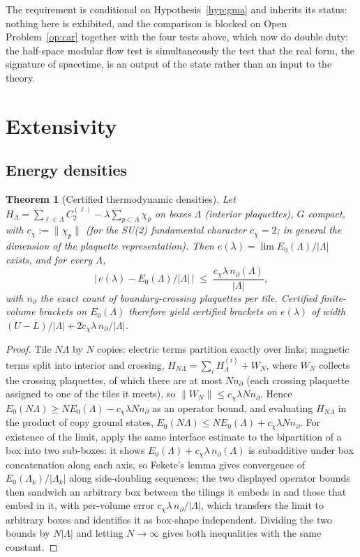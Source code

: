 \documentclass[11pt]{article}
\newtheorem{theorem}{Theorem}[section]
\theoremstyle{definition}
\theoremstyle{remark}
\begin{document}
The requirement is conditional on Hypothesis~\ref{hyp:gma} and inherits
its status: nothing here is exhibited, and the comparison is blocked on
Open Problem~\ref{op:car} together with the four tests above, which now
do double duty: the half-space modular flow test is simultaneously the
test that the real form, the signature of spacetime, is an output of
the state rather than an input to the theory.

\section{Extensivity}\label{sec:extensivity}

\subsection{Energy densities}
\begin{theorem}[Certified thermodynamic densities]\label{thm:density}
Let $H_\Lambda = \sum_{\ell \in \Lambda} C_2^{(\ell)} - \lambda
\sum_{p \subset \Lambda} \chi_p$ on boxes $\Lambda$ (interior
plaquettes), $G$ compact, with $c_\chi := \|\chi_p\|$ (for the SU(2)
fundamental character $c_\chi = 2$; in general the dimension of the
plaquette representation).  Then $e(\lambda) = \lim
E_0(\Lambda)/|\Lambda|$ exists, and for every $\Lambda$,
\[
\Big|\, e(\lambda) - E_0(\Lambda)/|\Lambda| \,\Big| \;\le\;
\frac{c_\chi\lambda\, n_\partial(\Lambda)}{|\Lambda|},
\]
with $n_\partial$ the exact count of boundary-crossing plaquettes per
tile.  Certified finite-volume brackets on $E_0(\Lambda)$ therefore yield
certified brackets on $e(\lambda)$ of width $(U - L)/|\Lambda| +
2c_\chi\lambda\, n_\partial/|\Lambda|$.
\end{theorem}
\begin{proof}
Tile $N\Lambda$ by $N$ copies: electric terms partition exactly over
links; magnetic terms split into interior and crossing, $H_{N\Lambda} =
\sum_i H_\Lambda^{(i)} + W_N$, where $W_N$ collects the crossing
plaquettes, of which there are at most $N n_\partial$ (each crossing
plaquette assigned to one of the tiles it meets), so $\|W_N\| \le
c_\chi\lambda N n_\partial$.
Hence $E_0(N\Lambda) \ge N E_0(\Lambda) - c_\chi\lambda N n_\partial$
as an
operator bound, and evaluating $H_{N\Lambda}$ in the product of copy
ground states, $E_0(N\Lambda) \le N E_0(\Lambda) + c_\chi\lambda N
n_\partial$.  For existence of the limit, apply the same interface
estimate to the bipartition of a box into two sub-boxes: it shows
$E_0(\Lambda) + c_\chi\lambda\, n_\partial(\Lambda)$ is subadditive
under box concatenation along each axis, so Fekete's lemma gives
convergence of $E_0(\Lambda_k)/|\Lambda_k|$ along side-doubling
sequences; the two displayed operator bounds then sandwich an
arbitrary box between the tilings it embeds in and those that embed in
it, with per-volume error $c_\chi\lambda\, n_\partial/|\Lambda|$,
which transfers the limit to arbitrary boxes and identifies it as
box-shape independent.  Dividing the two bounds by $N|\Lambda|$ and
letting $N \to \infty$ gives both inequalities with the same constant.
\end{proof}
\end{document}

